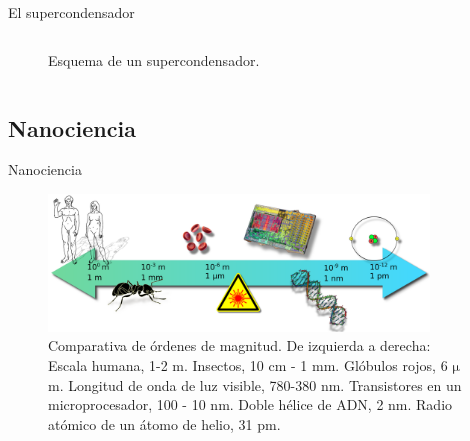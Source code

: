 \documentclass[aspectratio=169]{beamer}
\begin{document}
\begin{frame}{El supercondensador}
\begin{columns}
\begin{column}{0.5\textwidth}
\begin{figure}[h!]
					\caption{Esquema de un supercondensador.}
				\end{figure}
			\end{column}
		\end{columns}
	\end{frame}
		
	\subsection{Nanociencia}
	\begin{frame}{Nanociencia}
		\begin{figure}[h!]
			\centering
			\includegraphics[width=0.9\textwidth]{scale.pdf}
			\caption[Comparativa de ódenes de magnitud desde metros hasta picometros]{Comparativa de órdenes de magnitud. De izquierda a derecha: Escala humana, 1-2 m. Insectos, 10 cm - 1 mm. Glóbulos rojos, 6 $\mathrm{\mu}$m. Longitud de onda de luz visible, 780-380 nm. Transistores en un microprocesador, 100 - 10 nm. Doble hélice de ADN, 2 nm. Radio atómico de un átomo de helio, 31 pm.}
			\label{fig:scale}
		\end{figure}
	\end{frame}
\end{document}

